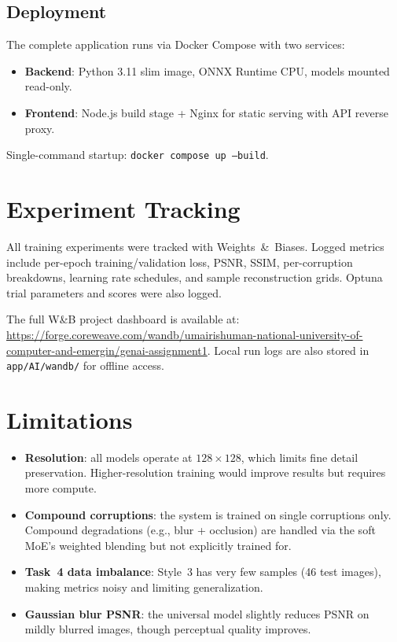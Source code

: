 \documentclass[conference]{IEEEtran}
\begin{document}
\subsection{Deployment}

The complete application runs via Docker Compose with two services:
\begin{itemize}
    \item \textbf{Backend}: Python 3.11 slim image, ONNX Runtime CPU, models mounted read-only.
    \item \textbf{Frontend}: Node.js build stage + Nginx for static serving with API reverse proxy.
\end{itemize}

Single-command startup: \texttt{docker compose up --build}.

\section{Experiment Tracking}

All training experiments were tracked with Weights~\&~Biases. Logged metrics include per-epoch training/validation loss, PSNR, SSIM, per-corruption breakdowns, learning rate schedules, and sample reconstruction grids. Optuna trial parameters and scores were also logged.

The full W\&B project dashboard is available at: \url{https://forge.coreweave.com/wandb/umairishuman-national-university-of-computer-and-emergin/genai-assignment1}. Local run logs are also stored in \texttt{app/AI/wandb/} for offline access.

\section{Limitations}

\begin{itemize}
    \item \textbf{Resolution}: all models operate at $128 \times 128$, which limits fine detail preservation. Higher-resolution training would improve results but requires more compute.
    \item \textbf{Compound corruptions}: the system is trained on single corruptions only. Compound degradations (e.g., blur + occlusion) are handled via the soft MoE's weighted blending but not explicitly trained for.
    \item \textbf{Task~4 data imbalance}: Style~3 has very few samples (46 test images), making metrics noisy and limiting generalization.
    \item \textbf{Gaussian blur PSNR}: the universal model slightly reduces PSNR on mildly blurred images, though perceptual quality improves.
\end{itemize}
\end{document}
